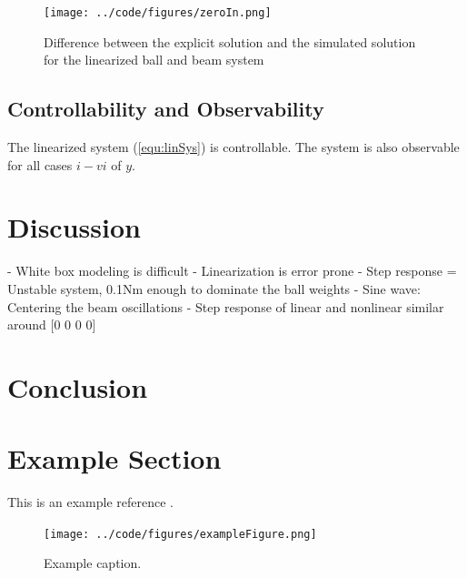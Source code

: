 \documentclass[a4paper, titlepage]{article}
\begin{document}
\begin{figure}[H]
\center
\texttt{[image: ../code/figures/zeroIn.png]}
\caption{Difference between the explicit solution and the simulated solution for the linearized ball and beam system}
\label{fig:zeroIn}
\end{figure}

\subsection{Controllability and Observability}
The linearized system (\ref{equ:linSys}) is controllable.
The system is also observable for all cases $i - vi$ of $y$.












\section{Discussion}
- White box modeling is difficult
- Linearization is error prone
- Step response = Unstable system, 0.1Nm enough to dominate the ball weights
- Sine wave: Centering the beam oscillations
- Step response of linear and nonlinear similar around [0 0 0 0]

\section{Conclusion}

\clearpage


\clearpage
\appendix

\section{Example Section}
This is an example reference \citep{glad00}.

\begin{figure}[h!]
\center
\texttt{[image: ../code/figures/exampleFigure.png]}
\caption{Example caption.}
\label{fig:exampleLable}
\end{figure}


\end{document}
